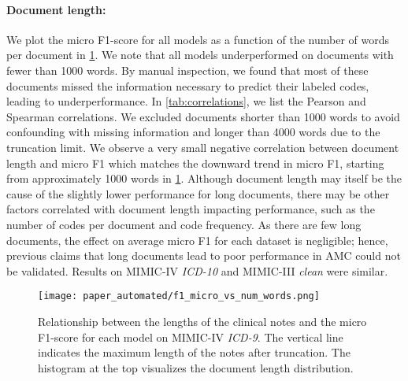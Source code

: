 {\paragraph{Document length:}\label{subsubsec:document-length}

We plot the micro F1-score for all models as a function of the number of words per document in \cref{fig:text_length}. 
We note that all models underperformed on documents with fewer than 1000 words. 
By manual inspection, we found that most of these documents missed the information necessary to predict their labeled codes, leading to underperformance. 
In \cref{tab:correlations}, we list the Pearson and Spearman correlations. We excluded documents shorter than 1000 words to avoid confounding with missing information and longer than 4000 words due to the truncation limit. We observe a very small negative correlation between document length and micro F1 which matches the downward trend in micro F1, starting from approximately 1000 words in \cref{fig:text_length}. 
Although document length may itself be the cause of the slightly lower performance for long documents, there may be other factors correlated with document length impacting performance, such as the number of codes per document and code frequency.
As there are few long documents, the effect on average micro F1 for each dataset is negligible; hence, previous claims that long documents lead to poor performance in AMC could not be validated. Results on MIMIC-IV \textit{ICD-10} and MIMIC-III \textit{clean} were similar.

\begin{figure}
    \centering
    \texttt{[image: paper\_automated/f1\_micro\_vs\_num\_words.png]}
    \caption[Relationship between the lengths of the clinical notes and the micro F1-score for each model on MIMIC-IV \textit{ICD-9}.]{Relationship between the lengths of the clinical notes and the micro F1-score for each model on MIMIC-IV \textit{ICD-9}. The vertical line indicates the maximum length of the notes after truncation. The histogram at the top visualizes the document length distribution.}
    \label{fig:text_length}
\end{figure}

}
